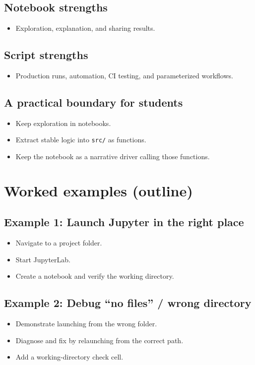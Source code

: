 \subsection{Notebook strengths}
\begin{itemize}
\item Exploration, explanation, and sharing results.
\end{itemize}

\subsection{Script strengths}
\begin{itemize}
\item Production runs, automation, CI testing, and parameterized workflows.
\end{itemize}

\subsection{A practical boundary for students}
\begin{itemize}
\item Keep exploration in notebooks.
\item Extract stable logic into \texttt{src/} as functions.
\item Keep the notebook as a narrative driver calling those functions.
\end{itemize}

\section{Worked examples (outline)}
\subsection{Example 1: Launch Jupyter in the right place}
\begin{itemize}
\item Navigate to a project folder.
\item Start JupyterLab.
\item Create a notebook and verify the working directory.
\end{itemize}

\subsection{Example 2: Debug ``no files'' / wrong directory}
\begin{itemize}
\item Demonstrate launching from the wrong folder.
\item Diagnose and fix by relaunching from the correct path.
\item Add a working-directory check cell.
\end{itemize}

